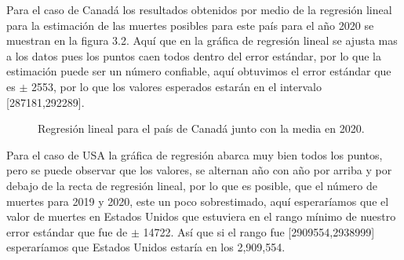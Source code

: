 \documentclass[12pt]{article}
\begin{document}
Para el caso de Canadá los resultados obtenidos por medio de la regresión lineal para la estimación de las muertes posibles para este país para el año 2020 se muestran en la figura 3.2.
Aquí que en la gráfica de regresión lineal se ajusta mas a los datos pues los puntos caen todos dentro del error estándar, por lo que la estimación puede ser un número confiable, aquí obtuvimos el error estándar que es $\pm$ 2553, por lo que los valores esperados estarán en el intervalo [287181,292289].


\begin{figure}[H]
\centering
{}%
\hfill
{}%
\hfill
\caption{Regresión lineal para el país de Canadá junto con la media en 2020.}

\label{fig:RegresionCanada}
\end{figure}   
\hfill

Para el caso de USA la gráfica de regresión abarca muy bien todos los puntos, pero se puede observar que los valores, se alternan año con año por arriba y por debajo de la recta de regresión lineal, por lo que es posible, que el número de muertes para 2019 y 2020, este un poco sobrestimado, aquí esperaríamos que el valor de muertes en Estados Unidos que estuviera en el rango mínimo de nuestro error estándar que fue de $\pm$ 14722. Así que si el rango fue [2909554,2938999] esperaríamos que Estados Unidos estaría en los 2,909,554.
\end{document}
